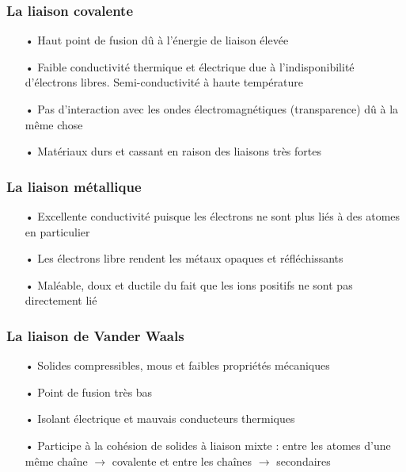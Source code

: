 		\subsubsection{La liaison covalente}
			\begin{itemize}
				\item[•] Haut point de fusion dû à l'énergie de liaison élevée
				\item[•] Faible conductivité thermique et électrique due à l'indisponibilité d'électrons libres. Semi-conductivité à haute température
				\item[•] Pas d'interaction avec les ondes électromagnétiques (transparence) dû à la même chose
				\item[•] Matériaux durs et cassant en raison des liaisons très fortes
			\end{itemize}		
		\subsubsection{La liaison métallique}
			\begin{itemize}
				\item[•] Excellente conductivité puisque les électrons ne sont plus liés à des atomes en particulier
				\item[•] Les électrons libre rendent les métaux opaques et réfléchissants
				\item[•] Maléable, doux et ductile du fait que les ions positifs ne sont pas directement lié
			\end{itemize}
			
		\subsubsection{La liaison de Vander Waals}
			\begin{itemize}			
			\item[•] Solides compressibles, mous et faibles propriétés mécaniques
			\item[•] Point de fusion très bas
			\item[•] Isolant électrique et mauvais conducteurs thermiques 
			\item[•] Participe à la cohésion de solides à liaison mixte : entre les atomes d'une même chaîne $\rightarrow$ covalente et entre les chaînes $\rightarrow$ secondaires
			\end{itemize}